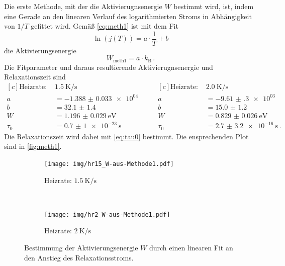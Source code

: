 Die erste Methode, mit der die Aktivierugnsenergie $W$ bestimmt wird, ist, indem eine Gerade an den linearen Verlauf des logarithmierten Stroms in Abhängigkeit von $1/T$ gefittet wird. Gemäß \autoref{eq:meth1} ist mit dem Fit
\begin{equation}
  \ln{(j(T))} = a \cdot \frac{1}{T} + b
\end{equation}
die Aktivierungsenergie
\begin{equation*}
  W_\text{meth1} = a \cdot k_\text{B}\,.
\end{equation*}
Die Fitparameter und daraus resultierende Aktivierugnsenergie und Relaxationszeit sind
\begin{equation*}
\begin{aligned}[c]
  \text{Heizrate: }& \SI{1.5}{\kelvin\per\second}\\
  a &= \num{-1.388(33)e+04}\\
  b &= \num{32.1(14)}\\
  W &= \SI{1.196(29)}{\electronvolt}\\
  \tau_0 &= \SI{0.7(10)e-23}{\second}
\end{aligned}
\qquad
\begin{aligned}[c]
  \text{Heizrate: }& \SI{2.0}{\kelvin\per\second}\\
  a &= \num{-9.61(30)e+03}\\
  b &= \num{15.0(12)}\\
  W &= \SI{0.829(26)}{\electronvolt}\\
  \tau_0 &= \SI{2.7(32)e-16}{\second}\,.
\end{aligned}
\end{equation*}
Die Relaxationszeit wird dabei mit \autoref{eq:tau0} bestimmt. Die ensprechenden Plot sind in \autoref{fig:meth1}.
\begin{figure}[htp]
    \centering
    \begin{subfigure}[t]{0.5\textwidth}
        \centering
        \texttt{[image: img/hr15\_W-aus-Methode1.pdf]}
        \caption{Heizrate: $\SI{1.5}{\kelvin\per\second}$}
    \end{subfigure}%
    ~
    \begin{subfigure}[t]{0.5\textwidth}
        \centering
        \texttt{[image: img/hr2\_W-aus-Methode1.pdf]}
        \caption{Heizrate: $\SI{2}{\kelvin\per\second}$}
    \end{subfigure}
    \caption{Bestimmung der Aktivierungsenergie $W$ durch einen linearen Fit an den Anstieg des Relaxationsstroms.}
    \label{fig:meth1}
\end{figure}

